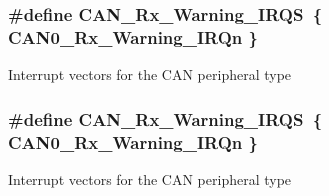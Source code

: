 \subsubsection[{\texorpdfstring{C\+A\+N\+\_\+\+Rx\+\_\+\+Warning\+\_\+\+I\+R\+QS}{CAN_Rx_Warning_IRQS}}]{\setlength{\rightskip}{0pt plus 5cm}\#define C\+A\+N\+\_\+\+Rx\+\_\+\+Warning\+\_\+\+I\+R\+QS~\{ {\bf C\+A\+N0\+\_\+\+Rx\+\_\+\+Warning\+\_\+\+I\+R\+Qn} \}}\hypertarget{group__CAN__Peripheral__Access__Layer_ga5609c3f62c9fe288c8362a6e1948375e}{}\label{group__CAN__Peripheral__Access__Layer_ga5609c3f62c9fe288c8362a6e1948375e}
Interrupt vectors for the C\+AN peripheral type 
\subsubsection[{\texorpdfstring{C\+A\+N\+\_\+\+Rx\+\_\+\+Warning\+\_\+\+I\+R\+QS}{CAN_Rx_Warning_IRQS}}]{\setlength{\rightskip}{0pt plus 5cm}\#define C\+A\+N\+\_\+\+Rx\+\_\+\+Warning\+\_\+\+I\+R\+QS~\{ {\bf C\+A\+N0\+\_\+\+Rx\+\_\+\+Warning\+\_\+\+I\+R\+Qn} \}}\hypertarget{group__CAN__Peripheral__Access__Layer_ga5609c3f62c9fe288c8362a6e1948375e}{}\label{group__CAN__Peripheral__Access__Layer_ga5609c3f62c9fe288c8362a6e1948375e}
Interrupt vectors for the C\+AN peripheral type 